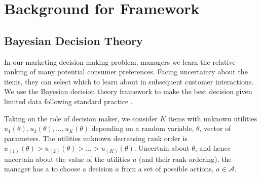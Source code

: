 \documentclass[blindrev,mnsc]{informs3}
\newcommand{\numitems}{K}
\begin{document}










\section{Background for Framework}

\subsection{Bayesian Decision Theory}

In our marketing decision making problem, managers we learn the relative ranking of many potential consumer preferences. Facing uncertainty about the items, they can select which to learn about in subsequent customer interactions. We use the Bayesian decision theory framework to make the best decision given limited data following standard practice \citep{GelmanEtAl2004}. 

Taking on the role of decision maker, we consider $\numitems$ items with unknown utilities $u_1(\theta),u_2(\theta), \ldots, u_\numitems(\theta)$ depending on a random variable, $\theta$,  vector of parameters. The utilities unknown decreasing rank order is $u_{(1)}(\theta) > u_{(2)}(\theta) > \ldots > u_{(\numitems)}(\theta)$. Uncertain about $\theta$, and hence uncertain about the value of the utilities $u$ (and their rank ordering), the manager has a to choose a decision $a$ from a set of possible actions, $a \in \mathcal{A}$. 
\end{document}
